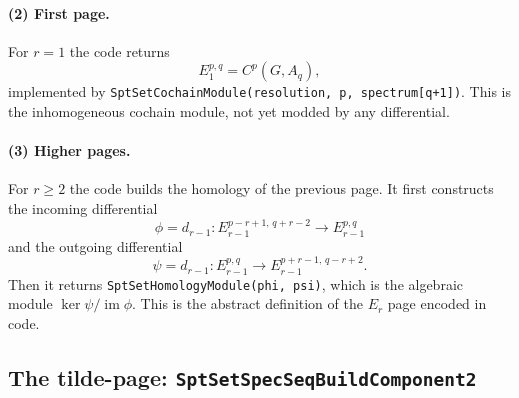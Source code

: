 \documentclass{SciPost}
\begin{document}
\paragraph{(2) First page.}
For $r=1$ the code returns
\begin{equation}
E_1^{p,q} = C^p(G, A_q),
\end{equation}
implemented by \texttt{SptSetCochainModule(resolution, p, spectrum[q+1])}.
This is the inhomogeneous cochain module, not yet modded by any differential.

\paragraph{(3) Higher pages.}
For $r\ge 2$ the code builds the homology of the previous page.
It first constructs the incoming differential
\begin{equation}
\phi = d_{r-1}: E_{r-1}^{p-r+1,\,q+r-2} \to E_{r-1}^{p,q}
\end{equation}
and the outgoing differential
\begin{equation}
\psi = d_{r-1}: E_{r-1}^{p,q} \to E_{r-1}^{p+r-1,\,q-r+2}.
\end{equation}
Then it returns \texttt{SptSetHomologyModule(phi, psi)}, which is the algebraic module $\ker \psi / \operatorname{im} \phi$.
This is the abstract definition of the $E_r$ page encoded in code.

\subsection{The tilde-page: \texttt{SptSetSpecSeqBuildComponent2}}
\end{document}
